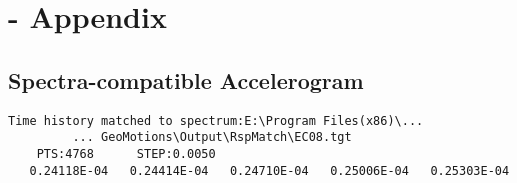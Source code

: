 \newpage
\thispagestyle{myheadings}
\chapter[Appendix B - Spectra-compatible Accelerogram]{- \hspace{0.5cm} Appendix}
\section*{\LARGE{Spectra-compatible Accelerogram}}
\vspace{0.5cm}
\label{app:B}

    \lstset{language=Tex,numbers=none}
       \begin{lstlisting}[frame=lines]
         Time history matched to spectrum:E:\Program Files(x86)\...
         ... GeoMotions\Output\RspMatch\EC08.tgt 
	PTS:4768      STEP:0.0050    
   0.24118E-04   0.24414E-04   0.24710E-04   0.25006E-04   0.25303E-04

       \end{lstlisting}
